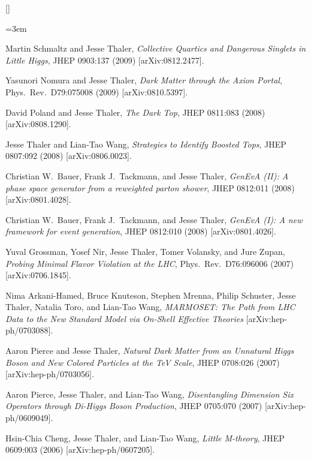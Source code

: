 \begin{list}{[]\addtocounter{jessecount}{-1}}{\leftmargin=3em \itemsep=4pt}
\item
 Martin Schmaltz and Jesse Thaler,
\emph{Collective Quartics and Dangerous Singlets in Little Higgs},
JHEP 0903:137 (2009)
[arXiv:0812.2477].

\item
 Yasunori Nomura and Jesse Thaler,
\emph{Dark Matter through the Axion Portal},
Phys.\ Rev.\ D79:075008 (2009)
[arXiv:0810.5397].

\item
 David Poland and Jesse Thaler,
\emph{The Dark Top},
JHEP 0811:083 (2008)
[arXiv:0808.1290].

\item
 Jesse Thaler and Lian-Tao Wang,
\emph{Strategies to Identify Boosted Tops},
JHEP 0807:092 (2008)
[arXiv:0806.0023].

\item
 Christian W.\ Bauer, Frank J.\ Tackmann, and Jesse Thaler,
\emph{GenEvA (II): A phase space generator from a reweighted parton shower},
JHEP 0812:011 (2008)
[arXiv:0801.4028].

\item
 Christian W.\ Bauer, Frank J.\ Tackmann, and Jesse Thaler,
\emph{GenEvA (I): A new framework for event generation},
JHEP 0812:010 (2008)
[arXiv:0801.4026].

\item
 Yuval Grossman, Yosef Nir, Jesse Thaler, Tomer Volansky, and Jure Zupan,
\emph{Probing Minimal Flavor Violation at the LHC},
Phys.\ Rev.\ D76:096006 (2007)
[arXiv:0706.1845].

\item
 Nima Arkani-Hamed, Bruce Knuteson, Stephen Mrenna, Philip Schuster, Jesse Thaler, Natalia Toro, and Lian-Tao Wang,
\emph{MARMOSET: The Path from LHC Data to the New Standard Model via On-Shell Effective Theories}
[arXiv:hep-ph/0703088].

\item
 Aaron Pierce and Jesse Thaler,
\emph{Natural Dark Matter from an Unnatural Higgs Boson and New Colored Particles at the TeV Scale},
JHEP 0708:026 (2007)
[arXiv:hep-ph/0703056].

\item
 Aaron Pierce, Jesse Thaler, and Lian-Tao Wang,
\emph{Disentangling Dimension Six Operators through Di-Higgs Boson Production},
JHEP 0705:070 (2007)
[arXiv:hep-ph/0609049].

\item
 Hsin-Chia Cheng, Jesse Thaler, and Lian-Tao Wang,
\emph{Little M-theory},
JHEP 0609:003 (2006)
[arXiv:hep-ph/0607205].


\end{list}
